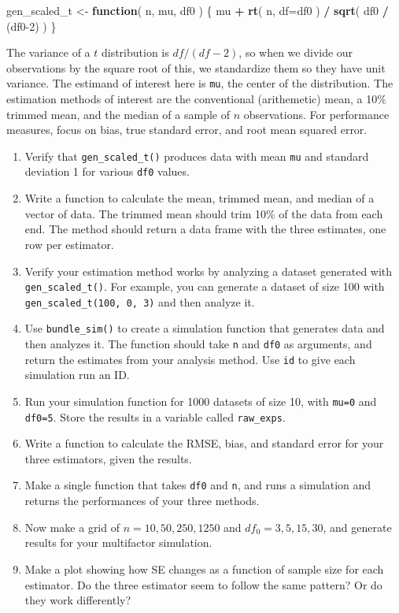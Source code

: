 \documentclass[
]{book}
\newenvironment{Shaded}{\begin{snugshade}}{\end{snugshade}}
\newcommand{\AttributeTok}[1]{\textcolor[rgb]{0.13,0.29,0.53}{#1}}
\newcommand{\ControlFlowTok}[1]{\textcolor[rgb]{0.13,0.29,0.53}{\textbf{#1}}}
\newcommand{\DecValTok}[1]{\textcolor[rgb]{0.00,0.00,0.81}{#1}}
\newcommand{\FunctionTok}[1]{\textcolor[rgb]{0.13,0.29,0.53}{\textbf{#1}}}
\newcommand{\NormalTok}[1]{#1}
\newcommand{\OtherTok}[1]{\textcolor[rgb]{0.56,0.35,0.01}{#1}}
\newcommand{\SpecialCharTok}[1]{\textcolor[rgb]{0.81,0.36,0.00}{\textbf{#1}}}
\begin{document}
\begin{Shaded}
\begin{Highlighting}[]
\NormalTok{gen\_scaled\_t }\OtherTok{\textless{}{-}} \ControlFlowTok{function}\NormalTok{( n, mu, df0 ) \{}
\NormalTok{    mu }\SpecialCharTok{+} \FunctionTok{rt}\NormalTok{( n, }\AttributeTok{df=}\NormalTok{df0 ) }\SpecialCharTok{/} \FunctionTok{sqrt}\NormalTok{( df0 }\SpecialCharTok{/}\NormalTok{ (df0}\DecValTok{{-}2}\NormalTok{) )}
\NormalTok{\}}
\end{Highlighting}
\end{Shaded}

The variance of a \(t\) distribution is \(df/(df-2)\), so when we divide our observations by the
square root of this, we standardize them so they have unit variance.
The estimand of interest here is \texttt{mu}, the center of the distribution.
The estimation methods of interest are the conventional (arithemetic) mean, a 10\% trimmed mean, and the median of a sample of \(n\) observations.
For performance measures, focus on bias, true standard error, and root mean squared error.

\begin{enumerate}
\def\labelenumi{\arabic{enumi}.}
\item
  Verify that \texttt{gen\_scaled\_t()} produces data with mean \texttt{mu} and standard deviation 1 for various \texttt{df0} values.
\item
  Write a function to calculate the mean, trimmed mean, and median of a vector of data.
  The trimmed mean should trim 10\% of the data from each end.
  The method should return a data frame with the three estimates, one row per estimator.
\item
  Verify your estimation method works by analyzing a dataset generated with \texttt{gen\_scaled\_t()}.
  For example, you can generate a dataset of size 100 with \texttt{gen\_scaled\_t(100,\ 0,\ 3)} and then analyze it.
\item
  Use \texttt{bundle\_sim()} to create a simulation function that generates data and then analyzes it.
  The function should take \texttt{n} and \texttt{df0} as arguments, and return the estimates from your analysis method.
  Use \texttt{id} to give each simulation run an ID.
\item
  Run your simulation function for 1000 datasets of size 10, with \texttt{mu=0} and \texttt{df0=5}.
  Store the results in a variable called \texttt{raw\_exps}.
\item
  Write a function to calculate the RMSE, bias, and standard error for your three estimators, given the results.
\item
  Make a single function that takes \texttt{df0} and \texttt{n}, and runs a simulation and returns the performances of your three methods.
\item
  Now make a grid of \(n = 10, 50, 250, 1250\) and \(df_0 =  3, 5, 15, 30\), and generate results for your multifactor simulation.
\item
  Make a plot showing how SE changes as a function of sample size for each estimator. Do the three estimator seem to follow the same pattern? Or do they work differently?
\end{enumerate}
\end{document}
